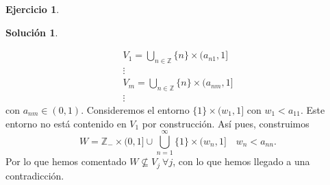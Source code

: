 \documentclass{article}
\theoremstyle{plain}
\theoremstyle{definition}
\newtheorem{exercise}{Ejercicio}
\newtheorem*{sol*}{Solución}
\newcommand{\Z}{\mathbb{Z}}
\begin{document}
\begin{exercise}
\begin{sol*}
\begin{itemize}
\begin{gather*}
V_1=\bigcup_{n\in\Z}\{n\}\times(a_{n1},1]\\
\vdots\\
V_m=\bigcup_{n\in\Z}\{n\}\times(a_{nm},1]\\
\vdots
\end{gather*}
con $a_{nm}\in(0,1)$. Consideremos el entorno $\{1\}\times(w_1,1]$ con $w_1<a_{11}$. Este entorno no está contenido en $V_1$ por construcción. Así pues, construimos 
\[W=\Z_-\times(0,1]\cup\bigcup_{n=1}^{\infty}\{1\}\times (w_n,1]\quad w_n<a_{nn}.\]
Por lo que hemos comentado $W\not\subseteq V_j\ \forall j$, con lo que hemos llegado a una contradicción. 
\end{itemize}

\end{sol*}
\end{exercise}
\end{document}
